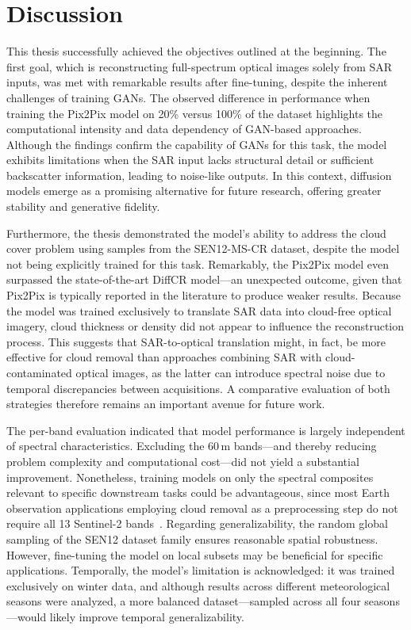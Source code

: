 \chapter{Discussion}
This thesis successfully achieved the objectives outlined at the beginning. The first goal, which is reconstructing full-spectrum optical images solely from SAR inputs, was met with remarkable results after fine-tuning, despite the inherent challenges of training GANs. The observed difference in performance when training the Pix2Pix model on 20\% versus 100\% of the dataset highlights the computational intensity and data dependency of GAN-based approaches.
Although the findings confirm the capability of GANs for this task, the model exhibits limitations when the SAR input lacks structural detail or sufficient backscatter information, leading to noise-like outputs. In this context, diffusion models emerge as a promising alternative for future research, offering greater stability and generative fidelity.

Furthermore, the thesis demonstrated the model’s ability to address the cloud cover problem using samples from the SEN12-MS-CR dataset, despite the model not being explicitly trained for this task. Remarkably, the Pix2Pix model even surpassed the state-of-the-art DiffCR model—an unexpected outcome, given that Pix2Pix is typically reported in the literature to produce weaker results.
Because the model was trained exclusively to translate SAR data into cloud-free optical imagery, cloud thickness or density did not appear to influence the reconstruction process. This suggests that SAR-to-optical translation might, in fact, be more effective for cloud removal than approaches combining SAR with cloud-contaminated optical images, as the latter can introduce spectral noise due to temporal discrepancies between acquisitions. A comparative evaluation of both strategies therefore remains an important avenue for future work.

The per-band evaluation indicated that model performance is largely independent of spectral characteristics. Excluding the 60\,m bands—and thereby reducing problem complexity and computational cost—did not yield a substantial improvement. Nonetheless, training models on only the spectral composites relevant to specific downstream tasks could be advantageous, since most Earth observation applications employing cloud removal as a preprocessing step do not require all 13 Sentinel-2 bands~\cite{CR_SEN2_dRNN}.
Regarding generalizability, the random global sampling of the SEN12 dataset family ensures reasonable spatial robustness. However, fine-tuning the model on local subsets may be beneficial for specific applications. Temporally, the model’s limitation is acknowledged: it was trained exclusively on winter data, and although results across different meteorological seasons were analyzed, a more balanced dataset—sampled across all four seasons—would likely improve temporal generalizability.

